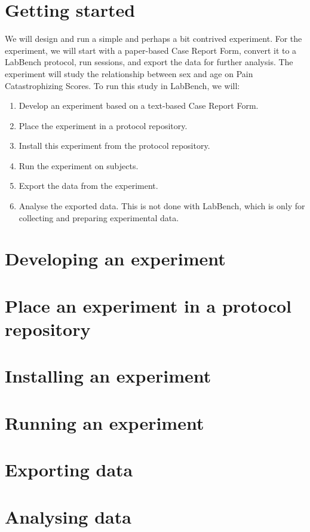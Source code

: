 \section{Getting started}

We will design and run a simple and perhaps a bit contrived experiment. For the experiment, we will start with a paper-based Case Report Form, convert it to a LabBench protocol, run sessions, and export the data for further analysis. The experiment will study the relationship between sex and age on Pain Catastrophizing Scores. To run this study in LabBench, we will:

\begin{enumerate}
\item Develop an experiment based on a text-based Case Report Form.
\item Place the experiment in a protocol repository.
\item Install this experiment from the protocol repository.
\item Run the experiment on subjects.
\item Export the data from the experiment.
\item Analyse the exported data. This is not done with LabBench, which is only for collecting and preparing experimental data.
\end{enumerate}    

\section{Developing an experiment}


\section{Place an experiment in a protocol repository}


\section{Installing an experiment}


\section{Running an experiment}


\section{Exporting data}


\section{Analysing data}

